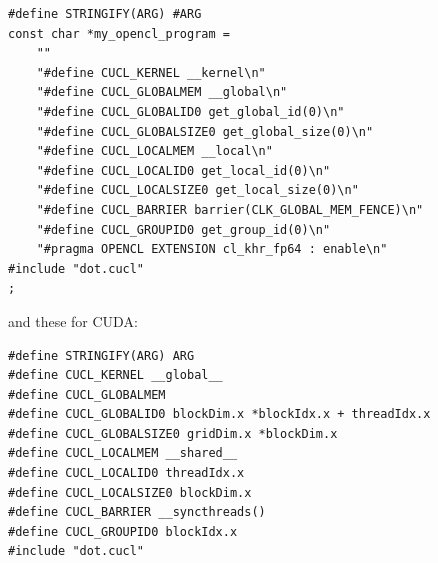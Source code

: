 \documentclass[11pt]{article}
\begin{document}
\begin{verbatim}
#define STRINGIFY(ARG) #ARG
const char *my_opencl_program =
    ""
    "#define CUCL_KERNEL __kernel\n"
    "#define CUCL_GLOBALMEM __global\n"
    "#define CUCL_GLOBALID0 get_global_id(0)\n"
    "#define CUCL_GLOBALSIZE0 get_global_size(0)\n"
    "#define CUCL_LOCALMEM __local\n"
    "#define CUCL_LOCALID0 get_local_id(0)\n"
    "#define CUCL_LOCALSIZE0 get_local_size(0)\n"
    "#define CUCL_BARRIER barrier(CLK_GLOBAL_MEM_FENCE)\n"
    "#define CUCL_GROUPID0 get_group_id(0)\n"
    "#pragma OPENCL EXTENSION cl_khr_fp64 : enable\n"
#include "dot.cucl"
;
\end{verbatim}

and these for CUDA:

\begin{verbatim}
#define STRINGIFY(ARG) ARG
#define CUCL_KERNEL __global__
#define CUCL_GLOBALMEM
#define CUCL_GLOBALID0 blockDim.x *blockIdx.x + threadIdx.x
#define CUCL_GLOBALSIZE0 gridDim.x *blockDim.x
#define CUCL_LOCALMEM __shared__
#define CUCL_LOCALID0 threadIdx.x
#define CUCL_LOCALSIZE0 blockDim.x
#define CUCL_BARRIER __syncthreads()
#define CUCL_GROUPID0 blockIdx.x
#include "dot.cucl"
\end{verbatim}
\end{document}
